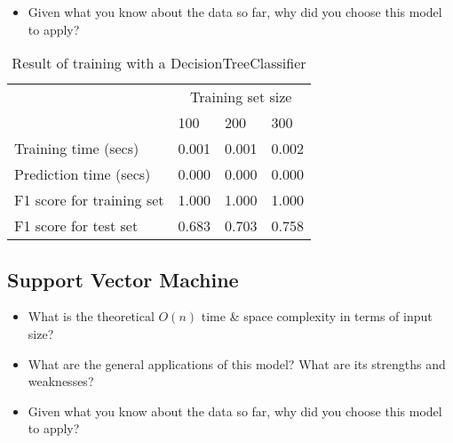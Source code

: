 \documentclass[12pt]{article}
\begin{document}
\begin{itemize} [noitemsep,nolistsep]
\begin{itemize}
\begin{itemize}[noitemsep,nolistsep]
                     \item The problem of learning an optimal decision tree is known to be NP-complete under several aspects of optimality and even for simple concepts. 
                     \item There are concepts that are hard to learn because decision trees do not express them easily, such as XOR, parity or multiplexer problems.
                     \item Decision tree learners create biased trees if some classes dominate. 
              \end{itemize}
       \end{itemize}


\item Given what you know about the data so far, why did you choose this model to apply?
\end{itemize} 


\setlength{\extrarowheight}{1.5pt}
\begin{table}[!htbp]
\caption{Result of training with a DecisionTreeClassifier} %
\centering %
\begin{tabular}{|p{6cm}|p{1.5cm}|p{1.5cm}|p{1.5cm}|} %
\hline %
& \multicolumn{3}{c|}{Training set size}\\[5pt]
\cline{2-4} 
& 100 & 200 & 300\\[0.5ex]
\hline %

Training time (secs)   &       0.001 & 0.001 & 0.002 \\
Prediction time (secs)   &     0.000 & 0.000 & 0.000 \\
F1 score for training set  &   1.000 & 1.000 & 1.000 \\
F1 score for test set    &     0.683 & 0.703 & 0.758 \\
\hline %
\end{tabular}
\label{decisionTreeTable}
\end{table}


\subsection*{Support Vector Machine}
\begin{itemize} [noitemsep,nolistsep]
\item What is the theoretical $O(n)$ time \& space complexity in terms of input size?
\item What are the general applications of this model? What are its strengths and weaknesses?
\item Given what you know about the data so far, why did you choose this model to apply?
\end{itemize} 
\end{document}
